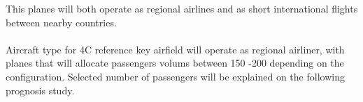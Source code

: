 	This planes will both operate as regional airlines and as short international flights between nearby countries.
	
	\paragraph{} Aircraft type for 4C reference key airfield will operate as regional airliner, with planes that will allocate passengers volums between 150 -200 depending on the configuration. Selected number of passengers will be explained on the following prognosis study.
	